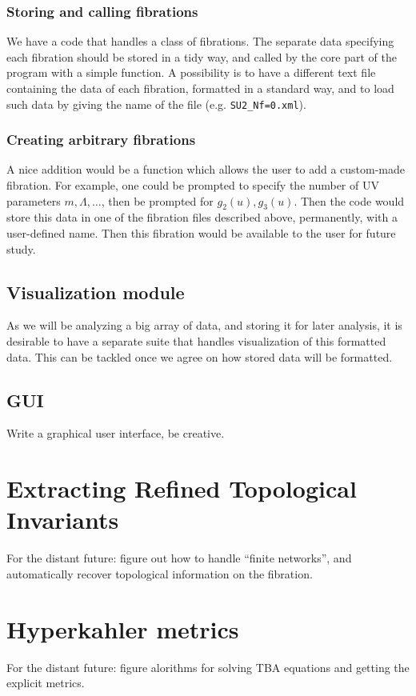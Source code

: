 \documentclass[11pt]{report}
\begin{document}
\subsection{Storing and calling fibrations}
We have a code that handles a class of fibrations. The separate data specifying each fibration should be stored in a tidy way, and called by the core part of the program with a simple function.
A possibility is to have a different text file containing the data of each fibration, formatted in a standard way, and to load such data by giving the name of the file (e.g. {\tt SU2\_Nf=0.xml}).

\subsection{Creating arbitrary fibrations}
A nice addition would be a function which allows the user to add a custom-made fibration. For example, one could be prompted to specify the number of UV parameters $m,\Lambda,\dots$, then be prompted for $g_{2}(u), g_{3}(u)$. Then the code would store this data in one of the fibration files described above, permanently, with a user-defined name. Then this fibration would be available to the user for future study.





\section{Visualization module}
As we will be analyzing a big array of data, and storing it for later analysis, it is desirable to have a separate suite that handles visualization of this formatted data.
This can be tackled once we agree on how stored data will be formatted.




\section{GUI}
Write a graphical user interface, be creative.



\chapter{Extracting Refined Topological Invariants}

For the distant future: figure out how to handle ``finite networks'', and automatically recover topological information on the fibration.





\chapter{Hyperkahler metrics}

For the distant future: figure alorithms for solving TBA equations and getting the explicit metrics.
\end{document}
